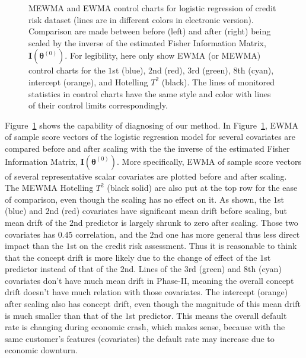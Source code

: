 \documentclass[twoside,11pt]{article}
\begin{document}
\begin{figure}[!htbp]
  \caption{
  MEWMA and EWMA control charts for logistic regression of credit risk dataset (lines are in different colors in electronic version). Comparison are made between before (left) and after (right) being scaled by the inverse of the estimated Fisher Information Matrix, $\mathbf {I} ( {\bm{\theta}} ^{(0)})$. For legibility, here only show EWMA (or MEWMA) control charts for the $1$st (blue), $2$nd (red), $3$rd (green), $8$th (cyan), intercept (orange), and Hotelling $T^2$ (black). The lines of monitored statistics in control charts have the same style and color with lines of their control limits correspondingly.
}
\label{fig:credit_default_diag}
\end{figure}

Figure~\ref{fig:credit_default_diag} shows the capability of diagnosing of our method. In Figure~\ref{fig:credit_default_diag}, EWMA of sample score vectors of the logistic regression model for several covariates are compared before and after scaling with the the inverse of the estimated Fisher Information Matrix, $\mathbf {I} ( {\bm{\theta}} ^{(0)})$. More specifically, EWMA of sample score vectors of several representative scalar covariates are plotted before and after scaling. The MEWMA Hotelling $T^2$ (black solid) are also put at the top row for the ease of comparison, even though the scaling has no effect on it. As shown, the $1$st (blue) and $2$nd (red) covariates have significant mean drift before scaling, but mean drift of the $2$nd predictor is largely shrunk to zero after scaling. Those two covariates has $0.45$ correlation, and the $2$nd one has more general thus less direct impact than the $1$st on the credit risk assessment. Thus it is reasonable to think that the concept drift is more likely due to the change of effect of the $1$st predictor instead of that of the $2$nd. Lines of the $3$rd (green) and $8$th (cyan) covariates don't have much mean drift in Phase-II, meaning the overall concept drift doesn't have much relation with those covariates. The intercept (orange) after scaling also has concept drift, even though the magnitude of this mean drift is much smaller than that of the $1$st predictor. This means the overall default rate is changing during economic crash, which makes sense, because with the same customer's features (covariates) the default rate may increase due to economic downturn. 
\end{document}

